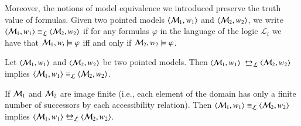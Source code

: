 
%
%


Moreover, the notions of model equivalence we introduced preserve
the truth value of formulas. Given two pointed models $\langle \mathcal{M}_1,w_1 \rangle$
and $\langle \mathcal{M}_2,w_2 \rangle$, we write $\langle \mathcal{M}_1,w_1 \rangle \equiv_\mathcal{L} \langle \mathcal{M}_2,w_2 \rangle$ if for any formulas $\varphi$ in the language of the logic
$\mathcal{L}_i$ we have that $\mathcal{M}_1,w_i \models \varphi$ iff and only if
$\mathcal{M}_2,w_2 \models \varphi$.


\begin{thm}\label{bisim}
Let $\langle \mathcal{M}_1, w_1 \rangle$ and $\langle \mathcal{M}_2,w_2 \rangle$ be two pointed
models. Then $\langle \mathcal{M}_1,w_1 \rangle$ $\bisim_\gL \tup{\gM_2,w_2}$ implies
$\langle \mathcal{M}_1,w_1 \rangle \equiv_{\mathcal{L}} \langle \mathcal{M}_2,w_2 \rangle$.

If
$\mathcal{M}_1$ and $\mathcal{M}_2$ are image finite (i.e., each element of the
domain has only a finite number of successors by each accessibility
relation). Then
$\langle \mathcal{M}_1, w_1 \rangle \equiv_{\mathcal{L}} \langle \mathcal{M}_2, w_2 \rangle$ implies
$\tup{\gM_1, w_1} \bisim_\gL \tup{\gM_2, w_2}$.
\end{thm}



